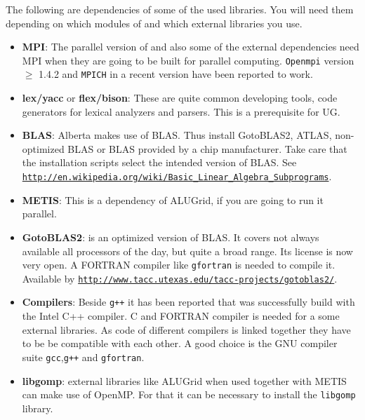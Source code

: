 The following are dependencies of some of the used libraries. You will need them depending on which modules of \Dune and which external libraries you use.

\begin{itemize}
\item \textbf{MPI}: The parallel version of \Dune and also some of the external dependencies need MPI when they are going to be built for parallel computing. \texttt{Openmpi} version $\geqslant$ 1.4.2 and \texttt{MPICH} in a recent version have been reported to work. 

\item \textbf{lex/yacc} or \textbf{flex/bison}: These are quite common developing tools, code generators for lexical analyzers and parsers. This is a prerequisite for UG.

\item \textbf{BLAS}: Alberta makes use of BLAS. Thus install GotoBLAS2, ATLAS, non-optimized BLAS or BLAS provided by a chip manufacturer. Take care that the installation scripts select the intended version of BLAS. See \texttt{\url{http://en.wikipedia.org/wiki/Basic_Linear_Algebra_Subprograms}}.

\item \textbf{METIS}: This is a dependency of ALUGrid, if you are going to run it parallel.

\item \textbf{GotoBLAS2}: is an optimized version of BLAS. It covers not always available all processors of the day, but quite a broad range. Its license is now very open.  A FORTRAN compiler like \texttt{gfortran} is needed to compile it.\\
Available by \texttt{\url{http://www.tacc.utexas.edu/tacc-projects/gotoblas2/}}.

\item \textbf{Compilers}: Beside \texttt{g++} it has been reported that \Dune was successfully build with the Intel C++ compiler. 
C and FORTRAN compiler is needed for a some external libraries. As code of different compilers is linked together they have to be be compatible with each other. A good choice is the GNU compiler suite \texttt{gcc},\texttt{g++} and \texttt{gfortran}.

\item \textbf{libgomp}: external libraries like ALUGrid when used together with METIS can make use of OpenMP. For that it can be necessary to install the \texttt{libgomp} library.

\end{itemize}

